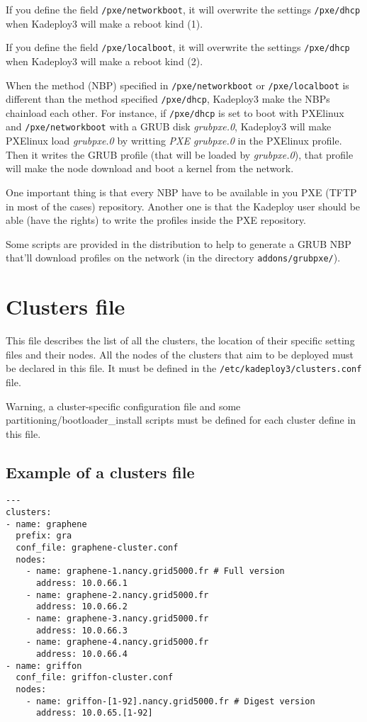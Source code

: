 \documentclass[a4wide,10pt,oneside]{book}
\newcommand{\ypath}[1]{\texttt{#1}}
\begin{document}
If you define the field \ypath{/pxe/networkboot}, it will overwrite the settings \ypath{/pxe/dhcp} when Kadeploy3 will make a reboot kind (1).

If you define the field \ypath{/pxe/localboot}, it will overwrite the settings \ypath{/pxe/dhcp} when Kadeploy3 will make a reboot kind (2).

When the method (NBP) specified in \ypath{/pxe/networkboot} or \ypath{/pxe/localboot} is different than the method specified \ypath{/pxe/dhcp}, Kadeploy3 make the NBPs chainload each other. For instance, if \ypath{/pxe/dhcp} is set to boot with PXElinux and \ypath{/pxe/networkboot} with a GRUB disk \emph{grubpxe.0}, Kadeploy3 will make PXElinux load \emph{grubpxe.0} by writting \emph{PXE grubpxe.0} in the PXElinux profile. Then it writes the GRUB profile (that will be loaded by \emph{grubpxe.0}), that profile will make the node download and boot a kernel from the network.

One important thing is that every NBP have to be available in you PXE (TFTP in most of the cases) repository. Another one is that the Kadeploy user should be able (have the rights) to write the profiles inside the PXE repository.

Some scripts are provided in the distribution to help to generate a GRUB NBP that'll download profiles on the network (in the directory \texttt{addons/grubpxe/}).


\section{Clusters file\label{sec:clusters_conf}}
This file describes the list of all the clusters, the location of their specific setting files and their nodes. All the nodes of the clusters that aim to be deployed must be declared in this file. It must be defined in the  \texttt{/etc/kadeploy3/clusters.conf} file.

Warning, a cluster-specific configuration file and some partitioning/bootloader\_install scripts must be defined for each cluster define in this file.

\subsection{Example of a clusters file\\}
\begin{small}
\begin{verbatim}
---
clusters:
- name: graphene
  prefix: gra
  conf_file: graphene-cluster.conf
  nodes:
    - name: graphene-1.nancy.grid5000.fr # Full version
      address: 10.0.66.1
    - name: graphene-2.nancy.grid5000.fr
      address: 10.0.66.2
    - name: graphene-3.nancy.grid5000.fr
      address: 10.0.66.3
    - name: graphene-4.nancy.grid5000.fr
      address: 10.0.66.4
- name: griffon
  conf_file: griffon-cluster.conf
  nodes:
    - name: griffon-[1-92].nancy.grid5000.fr # Digest version
      address: 10.0.65.[1-92]
\end{verbatim}
\end{small}
\end{document}
